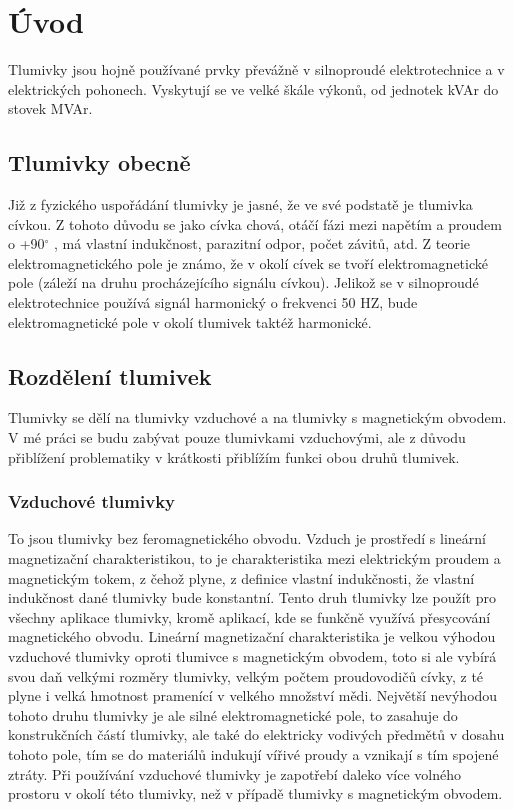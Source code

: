 \chapter{Úvod} \label{uvod}
Tlumivky jsou hojně používané prvky převážně v silnoproudé elektrotechnice a v elektrických pohonech. Vyskytují se ve velké škále výkonů, od jednotek kVAr do stovek MVAr. 

\section{Tlumivky obecně}
Již z fyzického uspořádání tlumivky je jasné, že ve své podstatě je tlumivka cívkou. Z tohoto důvodu se jako cívka chová, otáčí fázi mezi napětím a proudem o +90$^\circ$ , má vlastní indukčnost, parazitní odpor, počet závitů, atd. Z teorie elektromagnetického pole je známo, že v okolí cívek se tvoří elektromagnetické pole (záleží na druhu procházejícího signálu cívkou). Jelikož se v silnoproudé elektrotechnice používá signál harmonický o frekvenci 50 HZ, bude elektromagnetické pole v okolí tlumivek taktéž harmonické. 

\section{Rozdělení tlumivek}
Tlumivky se dělí na tlumivky vzduchové a na tlumivky s magnetickým obvodem. V mé práci se budu zabývat pouze tlumivkami vzduchovými, ale z důvodu přiblížení problematiky v krátkosti přiblížím funkci obou druhů tlumivek.

\subsection{Vzduchové tlumivky}
To jsou tlumivky bez feromagnetického obvodu. Vzduch je prostředí s lineární magnetizační charakteristikou, to je charakteristika mezi elektrickým proudem a magnetickým tokem, z čehož plyne, z definice vlastní indukčnosti, že vlastní indukčnost dané tlumivky bude konstantní. Tento druh tlumivky lze použít pro všechny aplikace tlumivky, kromě aplikací, kde se funkčně využívá přesycování magnetického obvodu. Lineární magnetizační charakteristika je velkou výhodou vzduchové tlumivky oproti tlumivce s magnetickým obvodem, toto si ale vybírá svou daň velkými rozměry tlumivky, velkým počtem proudovodičů cívky, z té plyne i velká hmotnost pramenící v velkého množství mědi. Největší nevýhodou tohoto druhu tlumivky je ale silné elektromagnetické pole, to zasahuje do konstrukčních částí tlumivky, ale také do elektricky vodivých předmětů v dosahu tohoto pole, tím se do materiálů indukují vířivé proudy a vznikají s tím spojené ztráty. Při používání vzduchové tlumivky je zapotřebí daleko více volného prostoru v okolí této tlumivky, než v případě tlumivky s magnetickým obvodem.   

